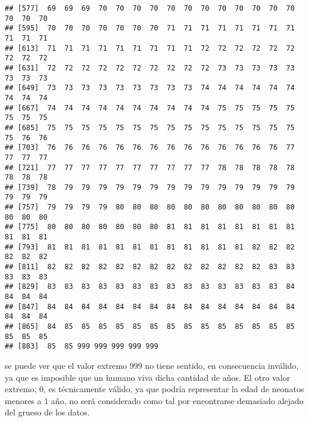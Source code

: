 \documentclass[
  10pt,
  spanish,
]{article}
\newenvironment{Shaded}{\begin{snugshade}}{\end{snugshade}}
\newcommand{\KeywordTok}[1]{\textcolor[rgb]{0.13,0.29,0.53}{\textbf{#1}}}
\newcommand{\NormalTok}[1]{#1}
\newcommand{\OperatorTok}[1]{\textcolor[rgb]{0.81,0.36,0.00}{\textbf{#1}}}
\newcommand{\OtherTok}[1]{\textcolor[rgb]{0.56,0.35,0.01}{#1}}
\newcommand{\StringTok}[1]{\textcolor[rgb]{0.31,0.60,0.02}{#1}}
\begin{document}
\begin{verbatim}
## [577]  69  69  69  70  70  70  70  70  70  70  70  70  70  70  70  70  70  70
## [595]  70  70  70  70  70  70  70  71  71  71  71  71  71  71  71  71  71  71
## [613]  71  71  71  71  71  71  71  71  71  72  72  72  72  72  72  72  72  72
## [631]  72  72  72  72  72  72  72  72  72  72  73  73  73  73  73  73  73  73
## [649]  73  73  73  73  73  73  73  73  73  74  74  74  74  74  74  74  74  74
## [667]  74  74  74  74  74  74  74  74  74  74  75  75  75  75  75  75  75  75
## [685]  75  75  75  75  75  75  75  75  75  75  75  75  75  75  75  75  76  76
## [703]  76  76  76  76  76  76  76  76  76  76  76  76  76  76  77  77  77  77
## [721]  77  77  77  77  77  77  77  77  77  77  78  78  78  78  78  78  78  78
## [739]  78  79  79  79  79  79  79  79  79  79  79  79  79  79  79  79  79  79
## [757]  79  79  79  79  80  80  80  80  80  80  80  80  80  80  80  80  80  80
## [775]  80  80  80  80  80  80  80  81  81  81  81  81  81  81  81  81  81  81
## [793]  81  81  81  81  81  81  81  81  81  81  81  81  82  82  82  82  82  82
## [811]  82  82  82  82  82  82  82  82  82  82  82  82  82  83  83  83  83  83
## [829]  83  83  83  83  83  83  83  83  83  83  83  83  83  83  84  84  84  84
## [847]  84  84  84  84  84  84  84  84  84  84  84  84  84  84  84  84  84  84
## [865]  84  85  85  85  85  85  85  85  85  85  85  85  85  85  85  85  85  85
## [883]  85  85 999 999 999 999 999
\end{verbatim}

se puede ver que el valor extremo 999 no tiene sentido, en consecuencia
inválido, ya que es imposible que un humano viva dicha cantidad de años.
El otro valor extremo, 0, es técnicamente válido, ya que podría
representar la edad de neonatos menores a 1 año, no será considerado
como tal por encontrarse demasiado alejado del grueso de los datos.

\begin{Shaded}
\end{Shaded}
\end{document}
